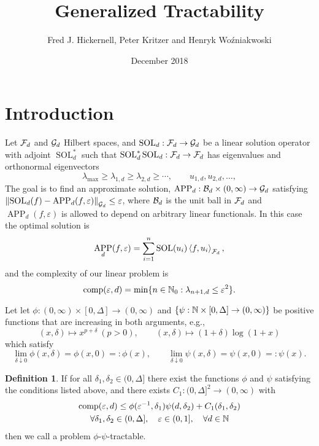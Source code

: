 \documentclass{article}
\title{Generalized Tractability}
\author{Fred J. Hickernell, Peter Kritzer and Henryk Wo\'zniakwoski}
\date{December 2018}
\DeclareMathOperator{\SOL}{SOL}
\DeclareMathOperator{\APP}{APP}
\theoremstyle{definition}
\newtheorem{definition}{Definition}
\begin{document}
\maketitle

\section{Introduction}

Let $\mathcal{F}_d$ and $\mathcal{G}_d$ Hilbert spaces, and $\SOL_d : \cf_d \to \cg_d$ be a linear solution operator with adjoint $\SOL_d^*$ such that $\SOL_d^*\SOL_d : \cf_d \to \cf_d$ has eigenvalues and orthonormal eigenvectors  
\[
\lambda_{\max} \ge \lambda_{1,d} \ge \lambda_{2,d} \ge \cdots, \qquad u_{1,d}, u_{2,d}, \ldots, 
\]
The goal is to find an approximate solution, $\APP_d:\cb_d \times (0,\infty) \to \cg_d$ satisfying $\norm[\cg_d]{\SOL_d(f) - \APP_d(f,\varepsilon)} \le \varepsilon$, where $\mathcal{B}_d$ is the unit ball in $\mathcal{F}_d$ and $\APP_d(f,\varepsilon)$ is allowed to depend on arbitrary linear functionals.  In this case the optimal solution is 
\[
\APP_d(f,\varepsilon) = \sum_{i=1}^n \SOL(u_i) \ip[\cf_d]{f}{u_i},
\]
and the complexity of our linear problem is
\[
\operatorname{comp}(\varepsilon, d) = \min \{n \in \mathbb{N}_{0} : \lambda_{n+1, d} \le \varepsilon^2\}.
\]

Let let $\phi : (0,\infty) \times [0,\Delta] \to (0,\infty)$ and $\{\psi : \mathbb{N}  \times [0,\Delta] \to (0,\infty)\}$ be positive functions that are increasing in both arguments, e.g., 
\[
(x,\delta) \mapsto x^{p + \delta} \ (p >0), \qquad (x,\delta) \mapsto (1 + \delta) \log(1+x)
\]
which satisfy
\begin{equation*}
    \lim_{\delta \downarrow 0} \phi(x,\delta) = \phi(x,0) =: \phi(x), \qquad 
    \lim_{\delta \downarrow 0} \psi(x,\delta) = \psi(x,0) =: \psi(x).
\end{equation*}


\begin{definition}
If for all $\delta_1, \delta_2 \in (0,\Delta]$ there exist the functions $\phi$ and $\psi$ satisfying the conditions listed above, and there exists $C_1 : (0,\Delta]^2 \to (0,\infty)$  with 
\begin{multline*}
    \operatorname{comp}(\varepsilon, d) \le \phi(\varepsilon^{-1},\delta_1)\psi(d,\delta_2) + C_1(\delta_1, \delta_2) \\
    \forall \delta_1, \delta_2 \in (0,\Delta], \quad  \varepsilon \in (0, 1], \quad \forall d \in \mathbb{N}
\end{multline*}
then we call a problem $\phi$-$\psi$-tractable.
\end{definition}
\end{document}
